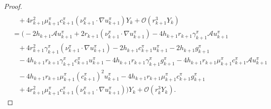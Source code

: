 \documentclass{article}
\theoremstyle{definition}
\numberwithin{equation}{section}
\begin{document}
\begin{proof}
\begin{align}
\nonumber \\ & \;\;\;
+ 4r_{k+1}^{2}\mu_{k+1}^{\pi}c_{k+1}^{\pi}(\nu_{k+1}^{\pi}\cdot \nabla u_{k+1}^{\pi})Y_{k} +\mathcal{O}(r_{k+1}^{3}Y_{k})
\nonumber  \\ & =
  \Big(-2h_{k+1}\mathcal{A}u_{k+1}^{\pi}  + 2r_{k+1}(\nu_{k+1}^{\pi}\cdot \nabla u_{k+1}^{\pi}) - 4h_{k+1}r_{k+1}\gamma_{k+1}^{\pi}\mathcal{A}u_{k+1}^{\pi} \nonumber  \\&  \;\;\; +  4r_{k+1}^{2}\gamma_{k+1}^{\pi} (\nu_{k+1}^{\pi} \cdot \nabla u_{k+1}^{\pi}) - 2h_{k+1}c_{k+1}^{\pi}u_{k+1}^{\pi} - 2h_{k+1}g_{k+1}^{\pi} \nonumber  \\&  \;\;\;  - 4h_{k+1}r_{k+1}\gamma_{k+1}^{\pi}c^{\pi}_{k+1}u_{k+1}^{\pi} - 4h_{k+1}r_{k+1}\gamma_{k+1}^{\pi}g^{\pi}_{k+1} - 4h_{k+1}r_{k+1}\mu_{k+1}^{\pi}c_{k+1}^{\pi} \mathcal{A}u_{k+1}^{\pi} \nonumber  \\&  \;\;\;  - 4h_{k+1}r_{k+1}\mu_{k+1}^{\pi}(c_{k+1}^{\pi})^{2}u_{k+1}^{\pi} - 4h_{k+1}r_{k+1}\mu_{k+1}^{\pi}c^{\pi}_{k+1}g^{\pi}_{k+1} \nonumber  \\& \;\;\; + 4r_{k+1}^{2}\mu_{k+1}^{\pi}c_{k+1}^{\pi}(\nu^{\pi}_{k+1}\cdot \nabla u_{k+1}^{\pi}) \Big)Y_{k}  
  + \mathcal{O}(r_{k}^{3}Y_{k}).\label{ref_eqn4.14}
\end{align}


\end{proof}
\end{document}
